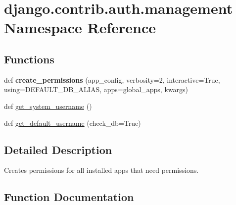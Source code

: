 \hypertarget{namespacedjango_1_1contrib_1_1auth_1_1management}{}\section{django.\+contrib.\+auth.\+management Namespace Reference}
\label{namespacedjango_1_1contrib_1_1auth_1_1management}
\subsection*{Functions}
\begin{DoxyCompactItemize}
\item 
\mbox{\label{namespacedjango_1_1contrib_1_1auth_1_1management_a578d6e3cffecc14ac3c1fc90c2f2f1fc}} 
def {\bfseries create\+\_\+permissions} (app\+\_\+config, verbosity=2, interactive=True, using=D\+E\+F\+A\+U\+L\+T\+\_\+\+D\+B\+\_\+\+A\+L\+I\+AS, apps=global\+\_\+apps, kwargs)
\item 
def \mbox{\hyperlink{namespacedjango_1_1contrib_1_1auth_1_1management_aada845bc6eed9154c36549c10b357c28}{get\+\_\+system\+\_\+username}} ()
\item 
def \mbox{\hyperlink{namespacedjango_1_1contrib_1_1auth_1_1management_a456c15422b44f67ce589814b62c05500}{get\+\_\+default\+\_\+username}} (check\+\_\+db=True)
\end{DoxyCompactItemize}


\subsection{Detailed Description}
\begin{DoxyVerb}Creates permissions for all installed apps that need permissions.
\end{DoxyVerb}
 

\subsection{Function Documentation}
\mbox{\label{namespacedjango_1_1contrib_1_1auth_1_1management_a456c15422b44f67ce589814b62c05500}} 
